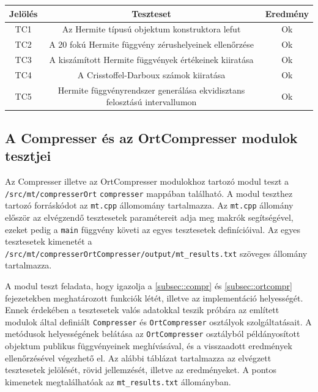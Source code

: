 \documentclass[oneside,titlepage,12pt,a4paper]{report}
\begin{document}
\begin{center}
\begin{adjustbox}{width=1\textwidth}
 \begin{tabular}{||c c c||} 
 \hline
 Jelölés & Teszteset & Eredmény\\ [0.5ex] 
 \hline\hline
 TC1 & Az Hermite típusú objektum konstruktora lefut &  Ok\\ 
 \hline
 TC2 & A 20 fokú Hermite függvény zérushelyeinek ellenőrzése &  Ok \\
 \hline
 TC3 & A kiszámított Hermite függvények értékeinek kiiratása & Ok \\
 \hline
 TC4 & A Crisstoffel-Darboux számok kiiratása & Ok \\
 \hline
  TC5 & Hermite függvényrendszer generálása ekvidisztans felosztású intervallumon & Ok \\
 \hline
\end{tabular}
\end{adjustbox}
\end{center}

\subsection{A Compresser és az OrtCompresser modulok tesztjei}

Az Compresser illetve az OrtCompresser modulokhoz tartozó modul teszt a \linebreak \texttt{/src/mt/compresserOrt} \linebreak \texttt{compresser} mappában található. A modul teszthez tartozó forráskódot az \texttt{mt.cpp} állomomány tartalmazza. Az \texttt{mt.cpp} állomány először az elvégzendő tesztesetek paramétereit adja meg makrók segítségével, ezeket pedig a \texttt{main} függvény \linebreak  követi az egyes  tesztesetek definícióival. Az egyes tesztesetek kimenetét a \linebreak  \texttt{/src/mt/compresserOrtCompresser/output/mt\_results.txt} szöveges állomány tartalmazza. 
\par A modul teszt feladata, hogy igazolja a \ref{subsec::compr} és \ref{subsec::ortcompr} fejezetekben meghatározott funkciók létét, illetve az implementáció helyességét. Ennek érdekében a tesztesetek valós adatokkal teszik próbára az említett modulok által definiált \texttt{Compresser} és \texttt{OrtCompresser} osztályok szolgáltatásait. A metódusok helyességének belátása az \texttt{OrtCompresser} osztályból példányosított objektum publikus függvényeinek meghívásával, és a visszaadott eredmények ellenőrzésével végezhető el. Az alábbi táblázat tartalmazza az elvégzett tesztesetek jelölését, rövid jellemzését, illetve az eredményeket. A pontos kimenetek megtalálhatóak az \texttt{mt\_results.txt} állományban.
\end{document}
